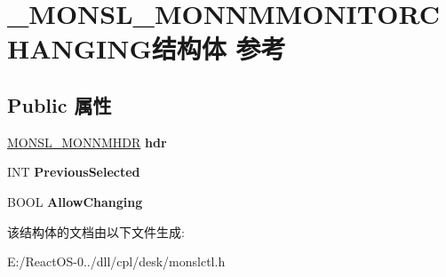 \hypertarget{struct___m_o_n_s_l___m_o_n_n_m_m_o_n_i_t_o_r_c_h_a_n_g_i_n_g}{}\section{\+\_\+\+M\+O\+N\+S\+L\+\_\+\+M\+O\+N\+N\+M\+M\+O\+N\+I\+T\+O\+R\+C\+H\+A\+N\+G\+I\+N\+G结构体 参考}
\label{struct___m_o_n_s_l___m_o_n_n_m_m_o_n_i_t_o_r_c_h_a_n_g_i_n_g}
\subsection*{Public 属性}
\begin{DoxyCompactItemize}
\item 
\mbox{\label{struct___m_o_n_s_l___m_o_n_n_m_m_o_n_i_t_o_r_c_h_a_n_g_i_n_g_a9ff7660e215dfbb748eff9988f1211c1}} 
\hyperlink{struct___m_o_n_s_l___m_o_n_n_m_h_d_r}{M\+O\+N\+S\+L\+\_\+\+M\+O\+N\+N\+M\+H\+DR} {\bfseries hdr}
\item 
\mbox{\label{struct___m_o_n_s_l___m_o_n_n_m_m_o_n_i_t_o_r_c_h_a_n_g_i_n_g_af13a2716894ab5b71b1bd6493448f94a}} 
I\+NT {\bfseries Previous\+Selected}
\item 
\mbox{\label{struct___m_o_n_s_l___m_o_n_n_m_m_o_n_i_t_o_r_c_h_a_n_g_i_n_g_a88bc5981c839f70ba3682a8da5751cae}} 
B\+O\+OL {\bfseries Allow\+Changing}
\end{DoxyCompactItemize}


该结构体的文档由以下文件生成\+:\begin{DoxyCompactItemize}
\item 
E\+:/\+React\+O\+S-\/0../dll/cpl/desk/monslctl.\+h\end{DoxyCompactItemize}
